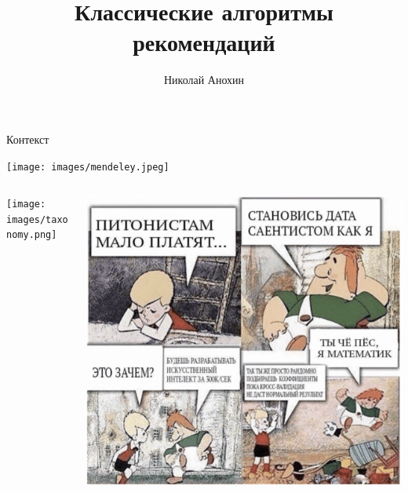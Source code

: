 \documentclass[11pt,aspectratio=169,handout]{beamer}
\author{Николай Анохин}
\title{Классические алгоритмы рекомендаций}
\begin{document}
{

\begin{frame}
\titlepage
\end{frame}


}

\begin{frame}{Контекст}

\begin{center}
\texttt{[image: images/mendeley.jpeg]}
\end{center}

\end{frame}

\begin{frame}

\begin{columns}

\begin{column}{0.47\textwidth} 

\begin{center}
\texttt{[image: images/taxonomy.png]}
\end{center}

\end{column}

\begin{column}{0.47\textwidth} 

\begin{center}
\includegraphics[scale=0.2]{images/karlson.png}
\end{center}

\end{column}

\end{columns}

\end{frame}
\end{document}

